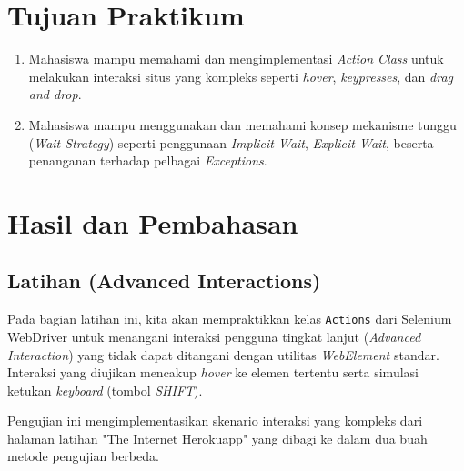 \documentclass[a4paper,oneside,12pt]{report}
\newcommand{\tocboldsection}[1]{%
  \protect\renewcommand{\protect\cftchapfont}{\protect\bfseries}%
  #1%
  \protect\renewcommand{\protect\cftchapfont}{}%
}
\begin{document}
\chapter[Tujuan Praktikum]{Tujuan Praktikum}
\begin{enumerate}
    \item Mahasiswa mampu memahami dan mengimplementasi \textit{Action Class} untuk melakukan interaksi situs yang kompleks seperti \textit{hover}, \textit{keypresses}, dan \textit{drag and drop}.
    \item Mahasiswa mampu menggunakan dan memahami konsep mekanisme tunggu (\textit{Wait Strategy}) seperti penggunaan \textit{Implicit Wait}, \textit{Explicit Wait}, beserta penanganan terhadap pelbagai \textit{Exceptions}.
\end{enumerate}
\clearpage

\chapter[\texorpdfstring{\tocboldsection{Hasil dan Pembahasan}}{Hasil dan Pembahasan}]{Hasil dan Pembahasan}

\section{Latihan (Advanced Interactions)}

Pada bagian latihan ini, kita akan mempraktikkan kelas \texttt{Actions} dari Selenium WebDriver untuk menangani interaksi pengguna tingkat lanjut (\textit{Advanced Interaction}) yang tidak dapat ditangani dengan utilitas \textit{WebElement} standar. Interaksi yang diujikan mencakup \textit{hover} ke elemen tertentu serta simulasi ketukan \textit{keyboard} (tombol \textit{SHIFT}).

Pengujian ini mengimplementasikan skenario interaksi yang kompleks dari halaman latihan "The Internet Herokuapp" yang dibagi ke dalam dua buah metode pengujian berbeda.
\end{document}
